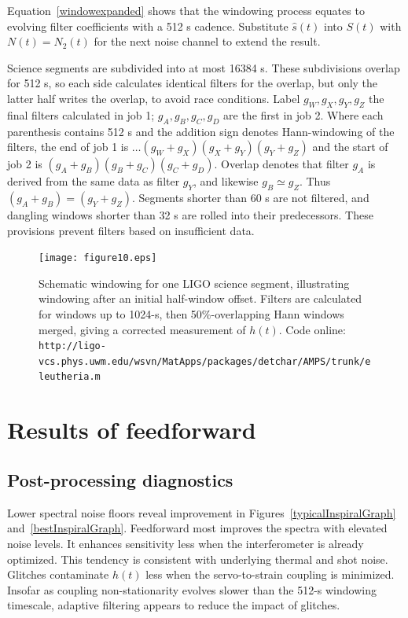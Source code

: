 	Equation~\ref{windowexpanded} shows that the windowing process equates to evolving filter coefficients with a 512 s cadence. Substitute $\hat{s}(t)$ into $S(t)$ with $N(t) = N_2(t)$ for the next noise channel to extend the result.

            Science segments are subdivided into at most 16384 s. These subdivisions overlap for 512 s, so each side calculates identical filters for the overlap, but only the latter half writes the overlap, to avoid race conditions. Label $g_W, g_X, g_Y, g_Z$ the final filters calculated in job 1; $g_A, g_B, g_C, g_D$ are the first in job 2. Where each parenthesis contains 512 s and the addition sign denotes Hann-windowing of the filters, the end of job 1 is $\ldots(g_W+g_X)(g_X+g_Y)(g_Y+g_Z)$ and the start of job 2 is $(g_A+g_B)(g_B+g_C)(g_C+g_D)$. Overlap denotes that filter $g_A$ is derived from the same data as filter $g_Y$, and likewise $g_B \simeq g_Z$. Thus $(g_A+g_B)=(g_Y+g_Z)$. Segments shorter than 60 s are not filtered, and dangling windows shorter than 32 s are rolled into their predecessors. These provisions prevent filters based on insufficient data. 

\begin{figure}
\begin{center}
\texttt{[image: figure10.eps]}
\caption{Schematic windowing for one LIGO science segment, illustrating windowing after an initial half-window offset. Filters are calculated for windows up to 1024-s, then 50\%-overlapping Hann windows merged, giving a corrected measurement of $h(t)$. Code online: \texttt{http://ligo-vcs.phys.uwm.edu/wsvn/MatApps/packages/detchar/AMPS/}\newline \texttt{trunk/eleutheria.m}}
\label{windowingScience}
\end{center}
\end{figure}

    \section{Results of feedforward}
    \label{all-results}

        \subsection{Post-processing diagnostics}
        \label{diagnostics}
 

Lower spectral noise floors reveal improvement in Figures~\ref{typicalInspiralGraph} and~\ref{bestInspiralGraph}. Feedforward most improves the spectra with elevated noise levels. It enhances sensitivity less when the interferometer is already optimized. This tendency is consistent with underlying thermal and shot noise. Glitches contaminate $h(t)$ less when the servo-to-strain coupling is minimized. Insofar as coupling non-stationarity evolves slower than the 512-s windowing timescale, adaptive filtering appears to reduce the impact of glitches.

